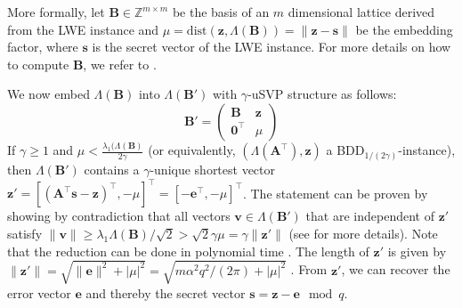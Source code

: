 More formally, let $\mathbf{B} \in \mathbb{Z}^{m \times m}$ be the basis of an $m$ dimensional lattice derived from the LWE instance and $\mu = \text{dist}(\mathbf{z}, \Lambda(\mathbf{B})) = \| \mathbf{z} - \mathbf{s}\|$ be the embedding factor, where $\mathbf{s}$ is the secret vector of the LWE instance. For more details on how to compute $\mathbf{B}$, we refer to \cite{AFG13}. %

We now embed $\Lambda(\mathbf{B})$ into $\Lambda(\mathbf{B}')$ with $\gamma$-uSVP structure as follows: %
\begin{equation}
  \mathbf{B}' = \begin{pmatrix}
    \mathbf{B}           & \mathbf{z} \\
    \mathbf{0}^\intercal & \mu
  \end{pmatrix}
\end{equation}
If $\gamma \geq 1$ and $\mu < \frac{\lambda_1(\Lambda(\mathbf{B})}{2\gamma}$ (or equivalently, $(\Lambda(\mathbf{A}^\intercal), \mathbf{z})$ a BDD$_{1/(2\gamma)}$-instance), then $\Lambda(\mathbf{B}')$ contains a $\gamma$-unique shortest vector $\mathbf{z}' = \left[(\mathbf{A}^\intercal\mathbf{s} - \mathbf{z})^\intercal, -\mu\right]^\intercal = \left[-\mathbf{e}^\intercal, -\mu\right]^\intercal$.
The statement can be proven by showing by contradiction that all vectors $\mathbf{v} \in \Lambda(\mathbf{B}')$ that are independent of $\mathbf{z}'$ satisfy $\| \mathbf{v}\| \geq \lambda_1{\Lambda(\mathbf{B})}/\sqrt{2} > \sqrt{2}\gamma \mu = \gamma \|\mathbf{z}'\|$ (see \cite[Section~4]{LM09} for more details). Note that the reduction can be done in polynomial time \cite[Theorem~4.1]{LM09}. %
The length of $\mathbf{z}'$ is given by $\|\mathbf{z}'\| = \sqrt{\|\mathbf{e}\|^2 + | \mu |^2} = \sqrt{m\alpha^2 q^2/(2\pi) + | \mu |^2}$ \cite{BBGS19}. From $\mathbf{z}'$, we can recover the error vector $\mathbf{e}$ and thereby the secret vector $\mathbf{s} = \mathbf{z} - \mathbf{e} \mod q$.

